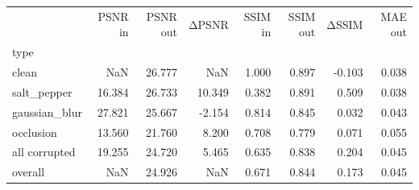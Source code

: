 \begin{tabular}{lrrrrrrr}
\toprule
 & PSNR in & PSNR out & ΔPSNR & SSIM in & SSIM out & ΔSSIM & MAE out \\
type &  &  &  &  &  &  &  \\
\midrule
clean & NaN & 26.777 & NaN & 1.000 & 0.897 & -0.103 & 0.038 \\
salt_pepper & 16.384 & 26.733 & 10.349 & 0.382 & 0.891 & 0.509 & 0.038 \\
gaussian_blur & 27.821 & 25.667 & -2.154 & 0.814 & 0.845 & 0.032 & 0.043 \\
occlusion & 13.560 & 21.760 & 8.200 & 0.708 & 0.779 & 0.071 & 0.055 \\
all corrupted & 19.255 & 24.720 & 5.465 & 0.635 & 0.838 & 0.204 & 0.045 \\
overall & NaN & 24.926 & NaN & 0.671 & 0.844 & 0.173 & 0.045 \\
\bottomrule
\end{tabular}
